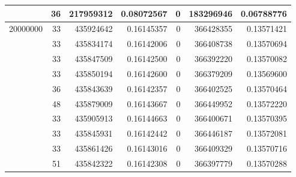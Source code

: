 \begin{tabular}{rrrrrrr}
          & 36 &   217959312 & 0.08072567 &  0 &   183296946 & 0.06788776 \\
\midrule
 20000000 & 33 &   435924642 & 0.16145357 &  0 &   366428355 & 0.13571421 \\
          & 33 &   435834174 & 0.16142006 &  0 &   366408738 & 0.13570694 \\
          & 33 &   435847509 & 0.16142500 &  0 &   366392220 & 0.13570082 \\
          & 33 &   435850194 & 0.16142600 &  0 &   366379209 & 0.13569600 \\
          & 36 &   435843639 & 0.16142357 &  0 &   366402525 & 0.13570464 \\
          & 48 &   435879009 & 0.16143667 &  0 &   366449952 & 0.13572220 \\
          & 33 &   435905913 & 0.16144663 &  0 &   366400671 & 0.13570395 \\
          & 33 &   435845931 & 0.16142442 &  0 &   366446187 & 0.13572081 \\
          & 33 &   435861426 & 0.16143016 &  0 &   366409329 & 0.13570716 \\
          & 51 &   435842322 & 0.16142308 &  0 &   366397779 & 0.13570288 \\
\bottomrule
\end{tabular}
